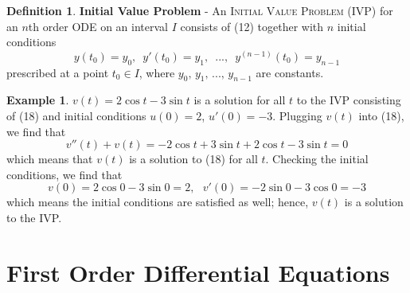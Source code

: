 \documentclass[11pt]{article}
\theoremstyle{definition}
\newtheorem{defn}{Definition}
\newtheorem{ex}{Example}
\begin{document}
\begin{shaded}
    \begin{defn}
    \textbf{Initial Value Problem} - An \textsc{Initial Value Problem (IVP)} for an $n$th order ODE on an interval $I$ consists of (12) together with $n$ initial conditions \begin{equation}
        y(t_0) = y_0,\,\,\, y'(t_0) = y_1,\,\,\, ...,\,\,\, y^{(n-1)}(t_0) = y_{n - 1}
    \end{equation} prescribed at a point $t_0 \in I$, where $y_0,\, y_1,\,...,\,y_{n-1}$ are constants.
\end{defn}
\end{shaded}
\begin{ex}
$v(t) = 2\cos{t} - 3\sin{t}$ is a solution for all $t$ to the IVP consisting of (18) and initial conditions $u(0) = 2$, $u'(0) = -3$. Plugging $v(t)$ into (18), we find that \begin{equation}
        v''(t) + v(t) = -2\cos{t} + 3\sin{t} + 2\cos{t} - 3\sin{t} = 0
    \end{equation} which means that $v(t)$ is a solution to (18) for all $t$. Checking the initial conditions, we find that \begin{equation}
        v(0) = 2\cos{0} - 3\sin{0} = 2,\,\,\,\,v'(0) = -2\sin{0} - 3\cos{0} = -3
    \end{equation} which means the initial conditions are satisfied as well; hence, $v(t)$ is a solution to the IVP.
\end{ex}
\newpage
\section{First Order Differential Equations}
\end{document}
